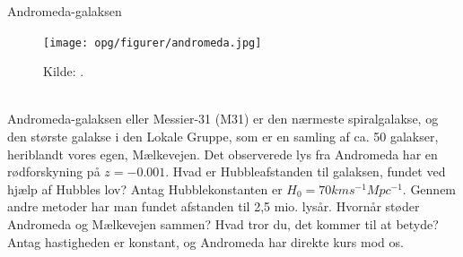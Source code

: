\begin{opgave}{Andromeda-galaksen}
		\begin{figure}[h!]
			\centering
			\texttt{[image: opg/figurer/andromeda.jpg]}
			\caption{Kilde: \cite{AndromedaGalaxy2019}.} %
			\label{andromeda} 
		\end{figure}\\
	Andromeda-galaksen eller Messier-31 (M31) er den nærmeste spiralgalakse, og den største galakse i den Lokale Gruppe, som er en samling af ca. 50 galakser, heriblandt vores egen, Mælkevejen.  
	\opg Det observerede lys fra Andromeda har en rødforskyning på $z = -0.001$.
	Hvad er Hubbleafstanden til galaksen, fundet ved hjælp af Hubbles lov? Antag Hubblekonstanten er $H_0=70 km s^{-1} Mpc^{-1}$.
	\opg Gennem andre metoder har man fundet afstanden til 2,5 mio. lysår. Hvornår støder Andromeda og Mælkevejen sammen? Hvad tror du, det kommer til at betyde? Antag hastigheden er konstant, og Andromeda har direkte kurs mod os.
\end{opgave}





